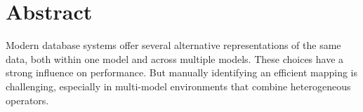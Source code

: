 








\section*{Abstract}

Modern database systems offer several alternative representations of the same data, both within one model and across multiple models. These choices have a strong influence on performance. But manually identifying an efficient mapping is challenging, especially in multi-model environments that combine heterogeneous operators.

